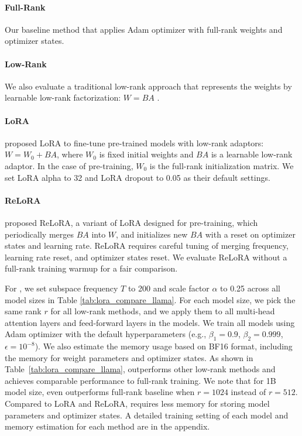 \paragraph{Full-Rank}
Our baseline method that applies Adam optimizer with full-rank weights and optimizer states.
\paragraph{Low-Rank}
We also evaluate a traditional low-rank approach that represents the weights by learnable low-rank factorization: $W = BA$ \citep{kamalakaraExploringLowRank2022}.
\paragraph{LoRA}
\citet{huLoRALowRankAdaptation2021} proposed LoRA to fine-tune pre-trained models with low-rank adaptors: $W = W_0 + BA$, where $W_0$ is fixed initial weights and $BA$ is a learnable low-rank adaptor. In the case of pre-training, $W_0$ is the full-rank initialization matrix.
We set LoRA alpha to 32 and LoRA dropout to 0.05 as their default settings.
\paragraph{ReLoRA}
\citet{lialinReLoRAHighRankTraining2023} proposed ReLoRA, a variant of LoRA designed for pre-training, which periodically merges $BA$ into $W$, and initializes new $BA$ with a reset on optimizer states and learning rate. ReLoRA requires careful tuning of merging frequency, learning rate reset, and optimizer states reset. We evaluate ReLoRA without a full-rank training warmup for a fair comparison.


For \lowrank{}, we set subspace frequency $T$ to 200 and scale factor $\alpha$ to 0.25 across all model sizes in Table \ref{tab:lora_compare_llama}.
For each model size, we pick the same rank $r$ for all low-rank methods, and we apply them to all multi-head attention layers and feed-forward layers in the models.
We train all models using Adam optimizer with the default hyperparameters (e.g., $\beta_1=0.9$, $\beta_2=0.999$, $\epsilon=10^{-8}$).
We also estimate the memory usage based on BF16 format, including the memory for weight parameters and optimizer states.
As shown in Table~\ref{tab:lora_compare_llama}, \lowrank{} outperforms other low-rank methods and achieves comparable performance to full-rank training.
We note that for 1B model size, \lowrank{} even outperforms full-rank baseline when $r=1024$ instead of $r=512$.
Compared to LoRA and ReLoRA, \lowrank{} requires less memory for storing model parameters and optimizer states. 
A detailed training setting of each model and memory estimation for each method are in the appendix.

